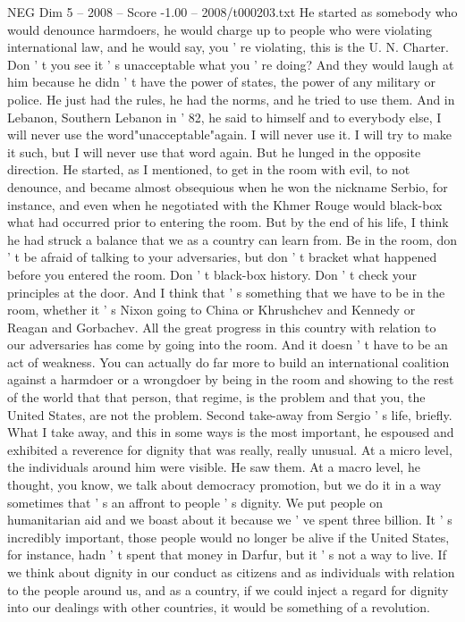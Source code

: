 \begin{textsample}{NEG Dim 5 – 2008 – Score -1.00 – 2008/t000203.txt}
He started as somebody who would denounce harmdoers, he would charge up to people who were violating international law, and he would say, you ' re violating, this is the U.
N.
Charter.
Don ' t you see it ' s unacceptable what you ' re doing?
And they would laugh at him because he didn ' t have the power of states, the power of any military or police.
He just had the rules, he had the norms, and he tried to use them.
And in Lebanon, Southern Lebanon in ' 82, he said to himself and to everybody else, I will never use the word"unacceptable"again.
I will never use it.
I will try to make it such, but I will never use that word again.
But he lunged in the opposite direction.
He started, as I mentioned, to get in the room with evil, to not denounce, and became almost obsequious when he won the nickname Serbio, for instance, and even when he negotiated with the Khmer Rouge would black-box what had occurred prior to entering the room.
But by the end of his life, I think he had struck a balance that we as a country can learn from.
Be in the room, don ' t be afraid of talking to your adversaries, but don ' t bracket what happened before you entered the room.
Don ' t black-box history.
Don ' t check your principles at the door.
And I think that ' s something that we have to be in the room, whether it ' s Nixon going to China or Khrushchev and Kennedy or Reagan and Gorbachev.
All the great progress in this country with relation to our adversaries has come by going into the room.
And it doesn ' t have to be an act of weakness.
You can actually do far more to build an international coalition against a harmdoer or a wrongdoer by being in the room and showing to the rest of the world that that person, that regime, is the problem and that you, the United States, are not the problem.
Second take-away from Sergio ' s life, briefly.
What I take away, and this in some ways is the most important, he espoused and exhibited a reverence for dignity that was really, really unusual.
At a micro level, the individuals around him were visible.
He saw them.
At a macro level, he thought, you know, we talk about democracy promotion, but we do it in a way sometimes that ' s an affront to people ' s dignity.
We put people on humanitarian aid and we boast about it because we ' ve spent three billion.
It ' s incredibly important, those people would no longer be alive if the United States, for instance, hadn ' t spent that money in Darfur, but it ' s not a way to live.
If we think about dignity in our conduct as citizens and as individuals with relation to the people around us, and as a country, if we could inject a regard for dignity into our dealings with other countries, it would be something of a revolution.

\end{textsample}
